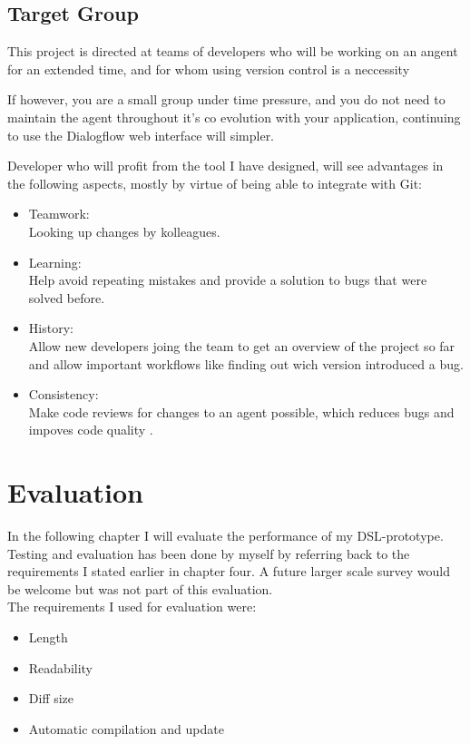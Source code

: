 \section{Target Group}

This project is directed at teams of developers who will be working on an angent for an extended time, and for whom using version control is a neccessity

If however, you are a small group under time pressure, and you do not need to maintain the agent throughout it's co evolution with your application, continuing to use the Dialogflow web interface will simpler.

Developer who will profit from the tool I have designed, will see advantages in the following aspects, mostly by virtue of being able to integrate with Git:
\begin{itemize}
    \item Teamwork: \\ Looking up changes by kolleagues.
    \item Learning: \\ Help avoid repeating mistakes and provide a solution to bugs that were solved before.
    \item History: \\ Allow new developers joing the team to get an overview of the project so far and allow important workflows like finding out wich version introduced a bug.
    \item Consistency: \\ Make code reviews for changes to an agent possible, which reduces bugs and impoves code quality \citeNeeded.
\end{itemize}

\chapter{Evaluation}
In the following chapter I will evaluate the performance of my DSL-prototype.
Testing and evaluation has been done by myself by referring back to the requirements I stated earlier in chapter four. A future larger scale survey would be welcome but was not part of this evaluation.\\
The requirements I used for evaluation were:
\begin{itemize}
    \item Length
    \item Readability
    \item Diff size
    \item Automatic compilation and update
\end{itemize}

